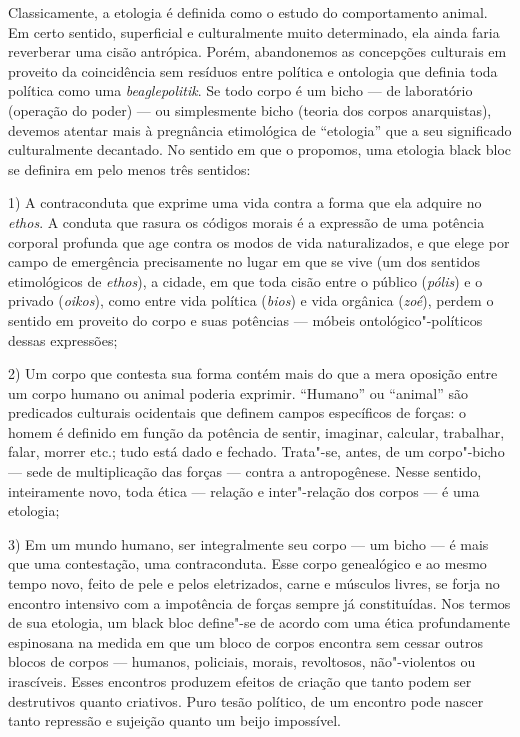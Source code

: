 Classicamente, a etologia é definida como o estudo do comportamento
animal. Em certo sentido, superficial e culturalmente muito determinado,
ela ainda faria reverberar uma cisão antrópica. Porém, abandonemos as
concepções culturais em proveito da coincidência sem resíduos entre
política e ontologia que definia toda política como uma
\emph{beaglepolitik}. Se todo corpo é um bicho --- de laboratório
(operação do poder) --- ou simplesmente bicho (teoria dos corpos
anarquistas), devemos atentar mais à pregnância etimológica de
``etologia'' que a seu significado culturalmente decantado. No sentido
em que o propomos, uma etologia black bloc se definira em pelo menos
três sentidos:

1) A contraconduta que exprime uma vida contra a forma que ela adquire
no \emph{ethos}. A conduta que rasura os códigos morais é a expressão de
uma potência corporal profunda que age contra os modos de vida
naturalizados, e que elege por campo de emergência precisamente no lugar
em que se vive (um dos sentidos etimológicos de \emph{ethos}), a cidade,
em que toda cisão entre o público (\emph{pólis}) e o privado
(\emph{oikos}), como entre vida política (\emph{bios}) e vida orgânica
(\emph{zoé}), perdem o sentido em proveito do corpo e suas potências ---
móbeis ontológico"-políticos dessas expressões;

2) Um corpo que contesta sua forma contém mais do que a mera oposição
entre um corpo humano ou animal poderia exprimir. ``Humano'' ou
``animal'' são predicados culturais ocidentais que definem campos
específicos de forças: o homem é definido em função da potência de
sentir, imaginar, calcular, trabalhar, falar, morrer etc.; tudo está
dado e fechado. Trata"-se, antes, de um corpo"-bicho --- sede de
multiplicação das forças --- contra a antropogênese. Nesse sentido,
inteiramente novo, toda ética --- relação e inter"-relação dos corpos --- é
uma etologia;

3) Em um mundo humano, ser integralmente seu corpo --- um bicho --- é mais
que uma contestação, uma contraconduta. Esse corpo genealógico e ao
mesmo tempo novo, feito de pele e pelos eletrizados, carne e músculos
livres, se forja no encontro intensivo com a impotência de forças sempre
já constituídas. Nos termos de sua etologia, um black bloc define"-se de
acordo com uma ética profundamente espinosana na medida em que um bloco
de corpos encontra sem cessar outros blocos de corpos --- humanos,
policiais, morais, revoltosos, não"-violentos ou irascíveis. Esses
encontros produzem efeitos de criação que tanto podem ser destrutivos
quanto criativos. Puro tesão político, de um encontro pode nascer tanto
repressão e sujeição quanto um beijo impossível.

